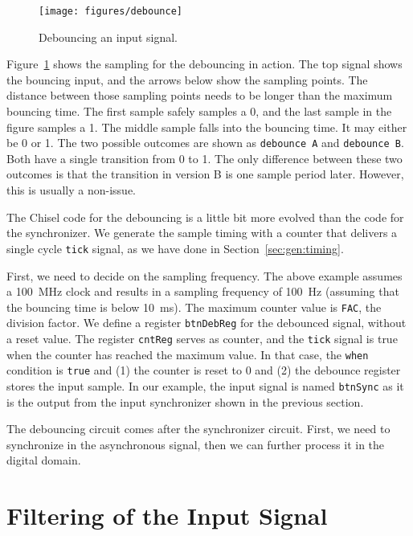 \documentclass[%
    10pt,
    headinclude, footexclude,
    openright, %
    notitlepage,
    cleardoubleempty,
    headsepline,
    pointlessnumbers,
    bibtotoc, idxtotoc,
    ]{scrbook}
\newcommand{\code}[1]{{\small{\texttt{#1}}}}
\begin{document}
\begin{figure}
  \centering
  \texttt{[image: figures/debounce]}
  \caption{Debouncing an input signal.}
  \label{fig:debounce}
\end{figure}

Figure~\ref{fig:debounce} shows the sampling for the debouncing in action.
The top signal shows the bouncing input, and the arrows below show the sampling
points. The distance between those sampling points needs to be longer
than the maximum bouncing time. The first sample safely samples a 0, and the last
sample in the figure samples a 1. The middle sample falls into the
bouncing time. It may either be 0 or 1. The two possible outcomes are
shown as \code{debounce A} and \code{debounce B}. 
Both have a single transition from 0 to 1. The only difference between these
two outcomes is that the transition in version B is one sample period later.
However, this is usually a non-issue.

The Chisel code for the debouncing is a little bit more evolved than the
code for the synchronizer.
We generate the sample timing with a counter that delivers a single
cycle \code{tick} signal, as we have done in Section~\ref{sec:gen:timing}.


First, we need to decide on the sampling frequency. The above example
assumes a 100~MHz clock and results in a sampling frequency of 100~Hz
(assuming that the bouncing time is below 10~ms). The maximum
counter value is \code{FAC}, the division factor.
We define a register \code{btnDebReg} for the debounced signal,
without a reset value. The register \code{cntReg} serves
as counter, and the \code{tick} signal is true when the counter has
reached the maximum value. In that case, the \code{when} condition
is \code{true} and (1) the counter is reset to 0 and (2) the debounce
register stores the input sample. In our example, the input signal is named
\code{btnSync} as it is the output from the input synchronizer shown
in the previous section.

The debouncing circuit comes after the synchronizer circuit.
First, we need to synchronize in the asynchronous signal, then
we can further process it in the digital domain.

\section{Filtering of the Input Signal}
\end{document}
